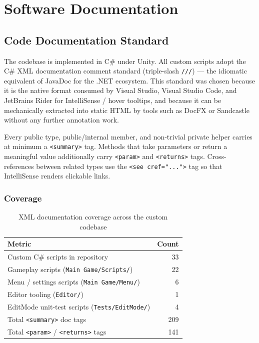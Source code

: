 \chapter{Software Documentation}
\label{chap:software}

\section{Code Documentation Standard}

The codebase is implemented in C\# under Unity. All custom scripts adopt the C\#
XML documentation comment standard (triple-slash \texttt{///}) --- the idiomatic
equivalent of JavaDoc for the .NET ecosystem. This standard was chosen because
it is the native format consumed by Visual Studio, Visual Studio Code, and
JetBrains Rider for IntelliSense / hover tooltips, and because it can be
mechanically extracted into static HTML by tools such as DocFX or Sandcastle
without any further annotation work.

Every public type, public/internal member, and non-trivial private helper
carries at minimum a \texttt{<summary>} tag. Methods that take parameters or
return a meaningful value additionally carry \texttt{<param>} and
\texttt{<returns>} tags. Cross-references between related types use the
\texttt{<see cref="...">} tag so that IntelliSense renders clickable links.

\subsection*{Coverage}

\begin{table}[H]
\centering
\begin{tabular}{|l|r|}
\hline
\textbf{Metric} & \textbf{Count} \\ \hline
Custom C\# scripts in repository & 33 \\ \hline
Gameplay scripts (\texttt{Main Game/Scripts/}) & 22 \\ \hline
Menu / settings scripts (\texttt{Main Game/Menu/}) & 6 \\ \hline
Editor tooling (\texttt{Editor/}) & 1 \\ \hline
EditMode unit-test scripts (\texttt{Tests/EditMode/}) & 4 \\ \hline
Total \texttt{<summary>} doc tags & 209 \\ \hline
Total \texttt{<param>} / \texttt{<returns>} tags & 141 \\ \hline
\end{tabular}
\caption{XML documentation coverage across the custom codebase}
\end{table}

